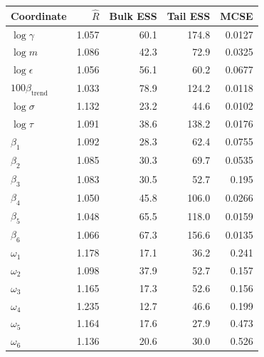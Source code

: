 \begin{tabular}{lrrrr}
\toprule
Coordinate & $\widehat R$ & Bulk ESS & Tail ESS & MCSE \\
\midrule
$\log\gamma$ & 1.057 & 60.1 & 174.8 & 0.0127 \\
$\log m$ & 1.086 & 42.3 & 72.9 & 0.0325 \\
$\log\epsilon$ & 1.056 & 56.1 & 60.2 & 0.0677 \\
$100\beta_{\mathrm{trend}}$ & 1.033 & 78.9 & 124.2 & 0.0118 \\
$\log\sigma$ & 1.132 & 23.2 & 44.6 & 0.0102 \\
$\log\tau$ & 1.091 & 38.6 & 138.2 & 0.0176 \\
$\beta_1$ & 1.092 & 28.3 & 62.4 & 0.0755 \\
$\beta_2$ & 1.085 & 30.3 & 69.7 & 0.0535 \\
$\beta_3$ & 1.083 & 30.5 & 52.7 & 0.195 \\
$\beta_4$ & 1.050 & 45.8 & 106.0 & 0.0266 \\
$\beta_5$ & 1.048 & 65.5 & 118.0 & 0.0159 \\
$\beta_6$ & 1.066 & 67.3 & 156.6 & 0.0135 \\
$\omega_1$ & 1.178 & 17.1 & 36.2 & 0.241 \\
$\omega_2$ & 1.098 & 37.9 & 52.7 & 0.157 \\
$\omega_3$ & 1.165 & 17.3 & 52.6 & 0.156 \\
$\omega_4$ & 1.235 & 12.7 & 46.6 & 0.199 \\
$\omega_5$ & 1.164 & 17.6 & 27.9 & 0.473 \\
$\omega_6$ & 1.136 & 20.6 & 30.0 & 0.526 \\
\bottomrule
\end{tabular}
